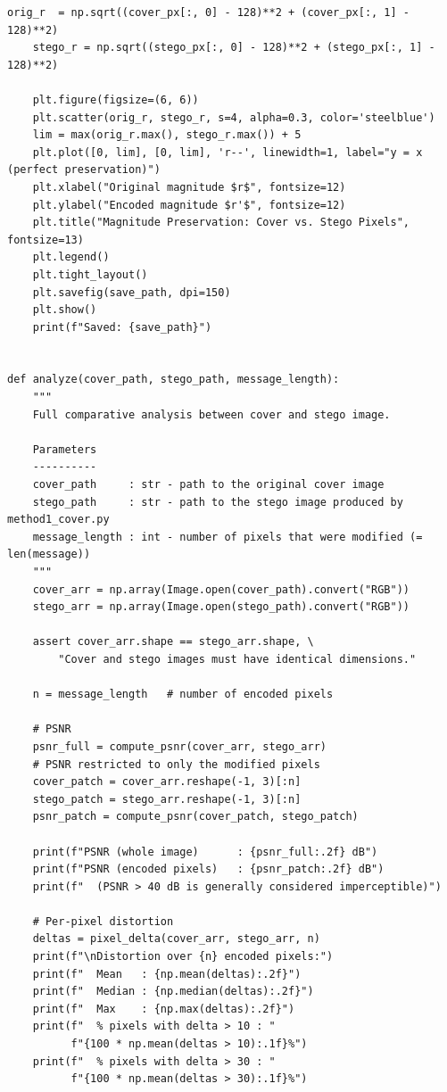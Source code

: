 \documentclass[12pt]{article}
\begin{document}
\begin{lstlisting}[caption={Comparative analysis of cover vs.\ stego image
(\texttt{analysis.py})}, label={lst:analysis}]
    orig_r  = np.sqrt((cover_px[:, 0] - 128)**2 + (cover_px[:, 1] - 128)**2)
    stego_r = np.sqrt((stego_px[:, 0] - 128)**2 + (stego_px[:, 1] - 128)**2)

    plt.figure(figsize=(6, 6))
    plt.scatter(orig_r, stego_r, s=4, alpha=0.3, color='steelblue')
    lim = max(orig_r.max(), stego_r.max()) + 5
    plt.plot([0, lim], [0, lim], 'r--', linewidth=1, label="y = x (perfect preservation)")
    plt.xlabel("Original magnitude $r$", fontsize=12)
    plt.ylabel("Encoded magnitude $r'$", fontsize=12)
    plt.title("Magnitude Preservation: Cover vs. Stego Pixels", fontsize=13)
    plt.legend()
    plt.tight_layout()
    plt.savefig(save_path, dpi=150)
    plt.show()
    print(f"Saved: {save_path}")


def analyze(cover_path, stego_path, message_length):
    """
    Full comparative analysis between cover and stego image.

    Parameters
    ----------
    cover_path     : str - path to the original cover image
    stego_path     : str - path to the stego image produced by method1_cover.py
    message_length : int - number of pixels that were modified (= len(message))
    """
    cover_arr = np.array(Image.open(cover_path).convert("RGB"))
    stego_arr = np.array(Image.open(stego_path).convert("RGB"))

    assert cover_arr.shape == stego_arr.shape, \
        "Cover and stego images must have identical dimensions."

    n = message_length   # number of encoded pixels

    # PSNR
    psnr_full = compute_psnr(cover_arr, stego_arr)
    # PSNR restricted to only the modified pixels
    cover_patch = cover_arr.reshape(-1, 3)[:n]
    stego_patch = stego_arr.reshape(-1, 3)[:n]
    psnr_patch = compute_psnr(cover_patch, stego_patch)

    print(f"PSNR (whole image)      : {psnr_full:.2f} dB")
    print(f"PSNR (encoded pixels)   : {psnr_patch:.2f} dB")
    print(f"  (PSNR > 40 dB is generally considered imperceptible)")

    # Per-pixel distortion
    deltas = pixel_delta(cover_arr, stego_arr, n)
    print(f"\nDistortion over {n} encoded pixels:")
    print(f"  Mean   : {np.mean(deltas):.2f}")
    print(f"  Median : {np.median(deltas):.2f}")
    print(f"  Max    : {np.max(deltas):.2f}")
    print(f"  % pixels with delta > 10 : "
          f"{100 * np.mean(deltas > 10):.1f}%")
    print(f"  % pixels with delta > 30 : "
          f"{100 * np.mean(deltas > 30):.1f}%")


\end{lstlisting}
\end{document}
